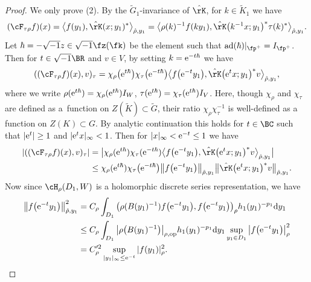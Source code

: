 \begin{proof}
We only prove (2). By the $\tilde{G}_1$-invariance of $\hat{\rK}$, for $k\in \tilde{K}_1$ we have
\begin{gather*} (\cF_{\tau\rho}f)(x)=\big\langle f(y_1),\hat{\rK}(x;y_1)^*\big\rangle_{\hat{\rho},y_1}
=\big\langle \rho(k)^{-1}f(ky_1),\hat{\rK}\big(k^{-1}x;y_1\big)^*\tau(k)^*\big\rangle_{\hat{\rho},y_1}. \end{gather*}
Let $\hbar=-\sqrt{-1}z\in\sqrt{-1}\fz(\fk)$ be the element such that $\operatorname{ad}(\hbar)|_{\fp^+}=I_{\fp^+}$.
Then for $t\in\sqrt{-1}\BR$ and $v\in V$, by setting $k={\rm e}^{-t\hbar}$ we have
\begin{gather*} ((\cF_{\tau\rho}f)(x),v)_\tau=\chi_\rho\big({\rm e}^{t\hbar}\big)\chi_\tau\big({\rm e}^{-t\hbar}\big)\big\langle f\big({\rm e}^{-t}y_1\big),
\hat{\rK}\big({\rm e}^tx;y_1\big)^*v\big\rangle_{\hat{\rho},y_1}, \end{gather*}
where we write $\rho({\rm e}^{t\hbar})=\chi_\rho({\rm e}^{t\hbar})I_W$, $\tau({\rm e}^{t\hbar})=\chi_\tau({\rm e}^{t\hbar})I_V$.
Here, though $\chi_\rho$ and $\chi_\tau$ are defined as a~function on $Z(\tilde{K})\subset \tilde{G}$,
their ratio $\chi_\rho\chi_\tau^{-1}$ is well-defined as a function on $Z(K)\subset G$.
By analytic continuation this holds for $t\in\BC$ such that $|{\rm e}^t|\ge 1$ and $|{\rm e}^t x|_\infty <1$.
Then for $|x|_\infty<{\rm e}^{-t}\le 1$ we have
\begin{align*}
|((\cF_{\tau\rho}f)(x),v)_\tau|&=\big|\chi_\rho({\rm e}^{t\hbar})\chi_\tau({\rm e}^{-t\hbar})\big\langle f\big({\rm e}^{-t}y_1\big),
\hat{\rK}\big({\rm e}^tx;y_1\big)^*v\big\rangle_{\hat{\rho},y_1}\big| \\
&\le \chi_\rho({\rm e}^{t\hbar})\chi_\tau\big({\rm e}^{-t\hbar}\big)\big\Vert f\big({\rm e}^{-t}y_1\big)\big\Vert_{\hat{\rho},y_1}
\big\Vert\hat{\rK}\big({\rm e}^tx;y_1\big)^*v\big\Vert_{\hat{\rho},y_1}.
\end{align*}
Now since $\cH_\rho(D_1,W)$ is a holomorphic discrete series representation, we have
\begin{align*}
\big\Vert f\big({\rm e}^{-t}y_1\big)\big\Vert_{\hat{\rho},y_1}^2
&=C_\rho\int_{D_1}\big(\rho(B(y_1)^{-1})f\big({\rm e}^{-t}y_1\big),f\big({\rm e}^{-t}y_1\big)\big)_\rho h_1(y_1)^{-p_1}{\rm d}y_1 \\
&\le C_\rho\int_{D_1}\big|\rho\big(B(y_1)^{-1}\big)\big|_{\rho,\mathrm{op}}h_1(y_1)^{-p_1}{\rm d}y_1 \sup_{y_1\in D_1}\big|f\big({\rm e}^{-t}y_1\big)\big|_\rho^2 \\
&=C_\rho^{\prime 2}\sup_{|y_1|_\infty\le {\rm e}^{-t}} |f(y_1)|_\rho^2.

\end{align*}
\end{proof}
